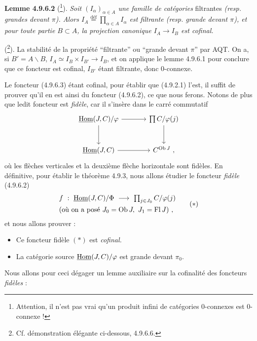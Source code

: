 \textbf{Lemme 4.9.6.2} (\footnote[97]{Attention, il n'est pas vrai qu'un produit infini de catégories 0-connexes est 0-connexe !}). \textit{Soit $(I_\alpha)_{\alpha \in A}$ une famille de catégories} filtrantes \textit{(resp. grandes devant $\pi$). Alors $I_A \stackrel{\text{déf}}{=} \prod_{\alpha \in A} I_\alpha$ est filtrante (resp. grande devant $\pi$), et pour toute partie $B \subset A$, la projection canonique $I_A \longrightarrow I_B$ est cofinal.} %

(\footnote[98]{Cf. démonstration élégante ci-dessous, 4.9.6.6.}). La stabilité de la propriété “filtrante” ou “grande devant $\pi$” par AQT. On a, si $B' = A\backslash B$, $I_A \simeq I_B \times I_{B'} \longrightarrow I_B$, et on applique le lemme 4.9.6.1 pour conclure que ce foncteur est cofinal, $I_{B'}$ étant filtrante, donc 0-connexe.

Le foncteur (4.9.6.3) étant cofinal, pour établir que (4.9.2.1) l'est, il suffit de prouver qu'il en est ainsi du foncteur (4.9.6.2), ce que nous ferons. Notons de plus que ledit foncteur est \textit{fidèle}, car il s'insère dans le carré commutatif
\[
\begin{tikzcd}[column sep=large, row sep=large]
\uHom(J,C)/\varphi \arrow[r] \arrow[d] & \prod C/\varphi(j) \arrow[d] \\
\uHom(J,C) \arrow[r] & C^{\Ob J}\ ,
\end{tikzcd}
\]
où les flèches verticales et la deuxième flèche horizontale sont fidèles. En définitive, pour établir le théorème 4.9.3, nous allons étudier le foncteur \textit{fidèle} (4.9.6.2)
\[
\begin{aligned}
&f \ : \ \uHom(J,C)/\Phi \ \longrightarrow \ \textstyle\prod_{j \in J_0} C/\varphi(j) \\ %
&\text{(où on a posé } J_0 = \Ob J,\ J_1 = \Fl J) \ ,
\end{aligned}
\tag*{$(*)$}
\]
et nous allons prouver :
\begin{itemize}[label={}]
\item[\textcircled{a}] Ce foncteur fidèle $(*)$ est \textit{cofinal.}
\item[\textcircled{b}] La catégorie source $\underline{\mathrm{Hom}}(J,C)/\varphi$ est grande devant $\pi_0$.
\end{itemize}
Nous allons pour ceci dégager un lemme auxiliaire sur la cofinalité des foncteurs \textit{fidèles} :

